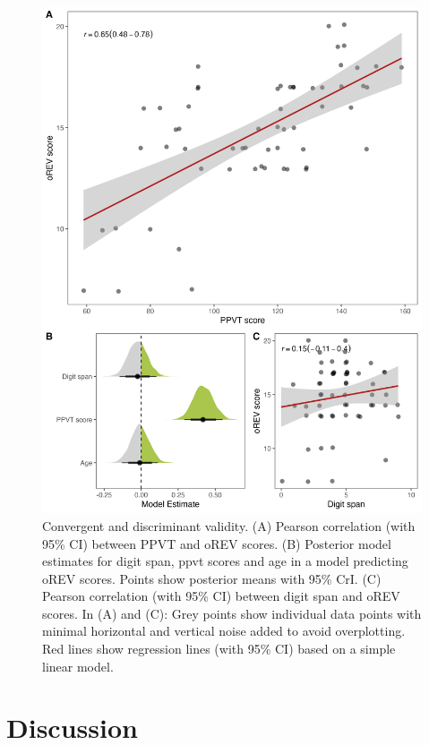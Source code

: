 \documentclass[
  man,floatsintext]{apa6}
\begin{document}
\begin{figure}

{\centering \includegraphics[width=0.5\linewidth]{../graphs/val_fig5} 

}

\caption{Convergent and discriminant validity. (A) Pearson correlation (with 95\% CI) between PPVT and oREV scores. (B) Posterior model estimates for digit span, ppvt scores and age in a model predicting oREV scores. Points show posterior means with 95\% CrI. (C) Pearson correlation (with 95\% CI) between digit span and oREV scores. In (A) and (C): Grey points show individual data points with minimal horizontal and vertical noise added to avoid overplotting. Red lines show regression lines (with 95\% CI) based on a simple linear model.}\label{fig:fig5}
\end{figure}

\hypertarget{discussion}{%
\section{Discussion}\label{discussion}}
\end{document}
